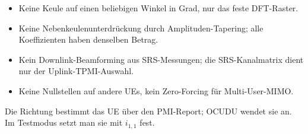 \begin{itemize}
  \item Keine Keule auf einen beliebigen Winkel in Grad, nur das feste DFT-Raster.
  \item Keine Nebenkeulenunterdrückung durch Amplituden-Tapering; alle Koeffizienten haben denselben Betrag.
  \item Kein Downlink-Beamforming aus SRS-Messungen; die SRS-Kanalmatrix dient nur der Uplink-TPMI-Auswahl.
  \item Keine Nullstellen auf andere UEs, kein Zero-Forcing für Multi-User-MIMO.
\end{itemize}
Die Richtung bestimmt das UE über den PMI-Report; OCUDU wendet sie an. Im Testmodus setzt man sie mit $i_{1,1}$ fest.
